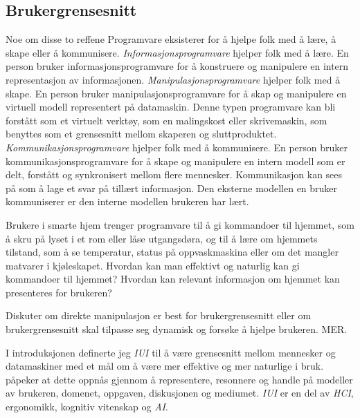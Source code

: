 \subsection{Brukergrensesnitt}
{\color{blue}Noe om disse to reffene}\citet{levold07} \citet{victor06}
Programvare eksisterer for å hjelpe folk med å lære, å skape eller å kommunisere. \emph{Informasjonsprogramvare} hjelper folk med å lære. En person bruker informasjonsprogramvare for å konstruere og manipulere en intern representasjon av informasjonen. \emph{Manipulasjonsprogramvare} hjelper folk med å skape. En person bruker manipulasjonsprogramvare for å skap og manipulere en virtuell modell representert på datamaskin. Denne typen programvare kan bli forstått som et virtuelt verktøy, som en malingskost eller skrivemaskin, som benyttes som et grensesnitt mellom skaperen og sluttproduktet. \emph{Kommunikasjonsprogramvare} hjelper folk med å kommunisere. En person bruker kommunikasjonsprogramvare for å skape og manipulere en intern modell som er delt, forstått og synkronisert mellom flere mennesker. Kommunikasjon kan sees på som å lage et svar på tillært informasjon. Den eksterne modellen en bruker kommuniserer er den interne modellen brukeren har lært.

Brukere i smarte hjem trenger programvare til å gi kommandoer til hjemmet, som å skru på lyset i et rom eller låse utgangsdøra, og til å lære om hjemmets tilstand, som å se temperatur, status på oppvaskmaskina eller om det mangler matvarer i kjøleskapet. Hvordan kan man effektivt og naturlig kan gi kommandoer til hjemmet? Hvordan kan relevant informasjon om hjemmet kan presenteres for brukeren?

{\color{red}Diskuter om direkte manipulasjon er best for brukergrensesnitt eller om brukergrensesnitt skal tilpasse seg dynamisk og forsøke å hjelpe brukeren. MER.}\citet{directmanipulation}

I introduksjonen definerte jeg \emph{IUI} til å være grensesnitt mellom mennesker og datamaskiner med et mål om å være mer effektive og mer naturlige i bruk. \citet{Kaufmann98} påpeker at dette oppnås gjennom å representere, resonnere og handle på modeller av brukeren, domenet, oppgaven, diskusjonen og mediumet. \emph{IUI} er en del av \emph{HCI}, ergonomikk, kognitiv vitenskap og \emph{AI}.


